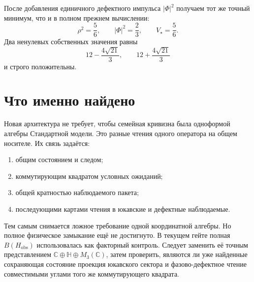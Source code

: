 После добавления единичного дефектного импульса $|\Phi|^2$ получаем тот же
точный минимум, что и в полном прежнем вычислении:
\begin{equation}
 \rho^2=\frac56,
 \qquad
 |\Phi|^2=\frac23,
 \qquad
 V_\star=\frac56.
\end{equation}
Два ненулевых собственных значения равны
\begin{equation}
 12-\frac{4\sqrt{21}}3,
 \qquad
 12+\frac{4\sqrt{21}}3
\end{equation}
и строго положительны.

\section{Что именно найдено}

Новая архитектура не требует, чтобы семейная кривизна была одноформой
алгебры Стандартной модели. Это разные чтения одного оператора на общем
носителе. Их связь задаётся:
\begin{enumerate}
 \item общим состоянием и следом;
 \item коммутирующим квадратом условных ожиданий;
 \item общей кратностью наблюдаемого пакета;
 \item последующими картами чтения в юкавские и дефектные наблюдаемые.
\end{enumerate}

Тем самым снимается ложное требование одной координатной алгебры. Но полное
физическое замыкание ещё не достигнуто. В текущем гейте полная
$B(H_{\mathrm{obs}})$ использовалась как факторный контроль. Следует
заменить её точным представлением
$\mathbb C\oplus\mathbb H\oplus M_3(\mathbb C)$, затем проверить, являются
ли уже найденные сохраняющая состояние проекция юкавского сектора и
фазово-дефектное чтение совместимыми углами того же коммутирующего квадрата.

